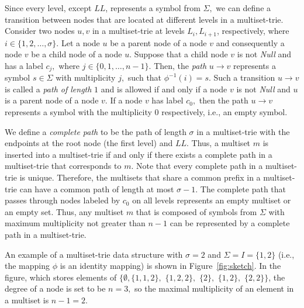 \documentclass[algorithms,article,accept,pdftex,moreauthors]{Definitions/mdpi}
\begin{document}
Since every level, except $LL$, represents a symbol from $\Sigma,$ we can define 
a transition between nodes that are located at different levels in a multiset-trie. 
%
Consider two nodes $u,v$ in a multiset-trie at levels $L_i, L_{i+1}$, respectively, 
where $i\in\{1,2,\ldots,\sigma\}.$ Let a node $u$ be a parent node of a node $v$ 
and consequently a node $v$ be a child node of a node $u.$ Suppose that a child 
node $v$ is not \emph{Null} and has a label $c_j,$ where $j\in\{ 0,1,\ldots, n-1 \}.$ 
%
Then, the \emph{path} $u\rightarrow v$ represents a symbol $s\in\Sigma$ with 
multiplicity $j,$ such that $\phi^{-1}(i) = s.$ 
%
Such a transition $u\rightarrow v$ is called a \emph{path of length} $1$ and is 
allowed if and only if a node $v$ is not \emph{Null} and $u$ is a parent node of 
a node $v.$ If a node $v$ has label $c_0,$ then the path $u\rightarrow v$ 
represents a symbol with the multiplicity $0$ respectively, i.e., an empty symbol.

We define a \emph{complete path} to be the path of length $\sigma$ in a 
multiset-trie with the endpoints at the root node (the first level) and $LL$. Thus, 
a multiset $m$ is inserted into a multiset-trie if and only if there exists a 
complete path in a multiset-trie that corresponds to $m.$
%
Note that every complete path in a multiset-trie is unique. Therefore, the multisets 
that share a common prefix in a multiset-trie can have a common path of length at 
most $\sigma-1.$ The complete path that passes through nodes labeled by $c_0$ 
on all levels represents an empty multiset or an empty set.
%
Thus, any multiset $m$ that is composed of symbols from $\Sigma$ with maximum 
multiplicity not greater than $n-1$ can be represented by a complete path in a multiset-trie.

An example of a multiset-trie data structure with $\sigma = 2$ and 
$\Sigma = I = \{ 1,2 \}$ (i.e., the mapping $\phi$ is an identity mapping) is shown in Figure~\ref{fig:sketch}. 
In the figure, which stores elements of $\{\emptyset, \{ 1,1,2 \},$ $\{ 1,2,2 \},$ $\{ 2 \},$ $\{ 1,2 \},$ $\{ 2,2 \}\}$, the degree of a node is set to be $n=3,$ so the maximal multiplicity of an element in 
a multiset is $n-1=2.$  
\end{document}
